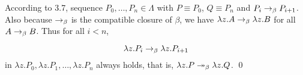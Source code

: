 \begin{pf} \rm
 According to 3.7, sequence $P_0,\ldots,P_n\in\Lambda$ with $P\equiv P_0$, 
 $Q\equiv P_n$ and $P_i\rightarrow_{\beta} P_{i+1}$.
 Also because $\rightarrow_{\beta}$ is the compatible closure of $\beta$, we have $\lambda z.A \rightarrow_{\beta} \lambda z.B$
 for all $A\rightarrow_{\beta} B$.  Thus for all $i < n$,

 \[\lambda z.P_i \rightarrow_{\beta} \lambda z.P_{i+1}\]
 in  $\lambda z.P_0, \lambda z.P_1, \ldots, \lambda z.P_n$ always holds, that is,
 $\lambda z.P\twoheadrightarrow_{\beta} \lambda z.Q$.
 \qed
\end{pf}
